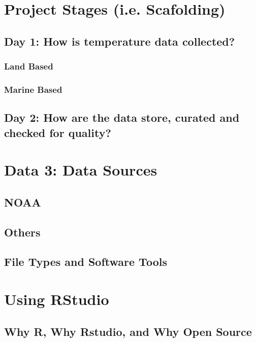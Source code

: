 \documentclass{article}\usepackage[]{graphicx}\usepackage[]{color}
\begin{document}
\section{Project Stages (i.e. Scafolding)}

\subsection{Day 1: How is temperature data collected?}

\subsubsection{Land Based}

\subsubsection{Marine Based}

\subsection{Day 2: How are the data store, curated and checked for quality?}

\section{Data 3: Data Sources}

\subsection{NOAA}

\subsection{Others}

\subsection{File Types and Software Tools}


\section{Using RStudio}

\subsection{Why R, Why Rstudio, and Why Open Source}
\end{document}

